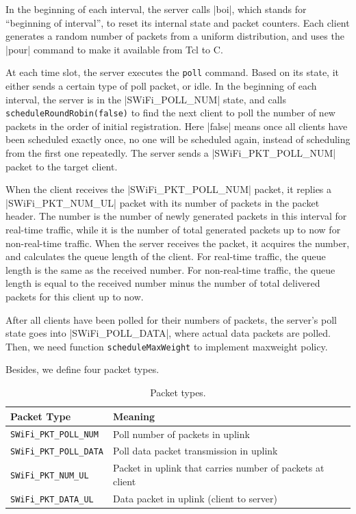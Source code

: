 \documentclass{article}
\begin{document}
\newcommand\CC{C\nolinebreak[4]\hspace{-.05em}\raisebox{0.3ex}{++}}

In the beginning of each interval, the server calls |boi|, which stands for
``beginning of interval'', to reset its internal state and packet counters.
Each client generates a random number of packets from a uniform distribution,
and uses the |pour| command to make it available from Tcl to \CC.

At each time slot, the server executes the \lstinline |poll| command.
Based on its state, it either sends a certain type of poll packet, or idle.
In the beginning of each interval, the server is in the |SWiFi_POLL_NUM| state,
and calls \lstinline |scheduleRoundRobin(false)| to find the next client
to poll the number of new packets
in the order of initial registration. Here |false| means
once all clients have been scheduled exactly once, no one will be scheduled
again, instead of scheduling from the first one repeatedly.
The server sends a |SWiFi_PKT_POLL_NUM| packet to the target client.

When the client receives the |SWiFi_PKT_POLL_NUM| packet, it replies a
|SWiFi_PKT_NUM_UL| packet with its number of packets in the packet header.
The number is the number
of newly generated packets in this interval for real-time traffic, while it is
the number of total generated packets up to now for non-real-time traffic.
When the server receives the packet, it acquires the number, and calculates the
queue length of the client. For real-time traffic, the queue length is the same
as the received number. For non-real-time traffic, the queue length is
equal to the received number minus the number of total delivered packets for
this client up to now.

After all clients have been polled for their numbers of packets, the server's
poll state goes into |SWiFi_POLL_DATA|, where actual data packets are polled.
Then, we need function \lstinline |scheduleMaxWeight| to implement maxweight policy. 

Besides, we define four packet types. 
\begin{table}[h!]
   \centering
   \caption{Packet types.}
   \label{tab:table3}
   \begin{tabular}{| l | l |}
      \hline
      Packet Type  &  Meaning\\ \hline
      \lstinline |SWiFi_PKT_POLL_NUM| & Poll number of packets in uplink\\ \hline 
      \lstinline |SWiFi_PKT_POLL_DATA|  & Poll data packet transmission in uplink\\ \hline 
      \lstinline |SWiFi_PKT_NUM_UL| & Packet in uplink that carries number of packets at client\\ \hline 
      \lstinline |SWiFi_PKT_DATA_UL| & Data packet in uplink (client to server)\\  
     \hline
   \end{tabular}
\end{table}
 
\end{document}
